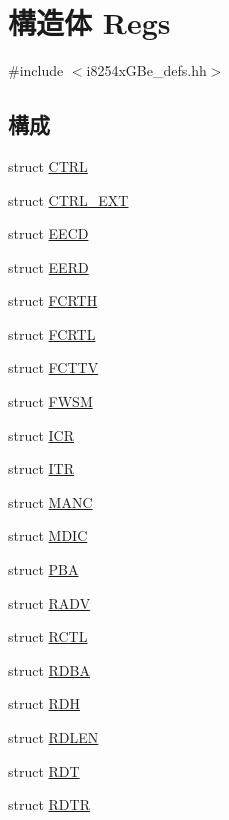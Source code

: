 \hypertarget{structiGbReg_1_1Regs}{
\section{構造体 Regs}
\label{structiGbReg_1_1Regs}
}


{\ttfamily \#include $<$i8254xGBe\_\-defs.hh$>$}\subsection*{構成}
\begin{DoxyCompactItemize}
\item 
struct \hyperlink{structiGbReg_1_1Regs_1_1CTRL}{CTRL}
\item 
struct \hyperlink{structiGbReg_1_1Regs_1_1CTRL__EXT}{CTRL\_\-EXT}
\item 
struct \hyperlink{structiGbReg_1_1Regs_1_1EECD}{EECD}
\item 
struct \hyperlink{structiGbReg_1_1Regs_1_1EERD}{EERD}
\item 
struct \hyperlink{structiGbReg_1_1Regs_1_1FCRTH}{FCRTH}
\item 
struct \hyperlink{structiGbReg_1_1Regs_1_1FCRTL}{FCRTL}
\item 
struct \hyperlink{structiGbReg_1_1Regs_1_1FCTTV}{FCTTV}
\item 
struct \hyperlink{structiGbReg_1_1Regs_1_1FWSM}{FWSM}
\item 
struct \hyperlink{structiGbReg_1_1Regs_1_1ICR}{ICR}
\item 
struct \hyperlink{structiGbReg_1_1Regs_1_1ITR}{ITR}
\item 
struct \hyperlink{structiGbReg_1_1Regs_1_1MANC}{MANC}
\item 
struct \hyperlink{structiGbReg_1_1Regs_1_1MDIC}{MDIC}
\item 
struct \hyperlink{structiGbReg_1_1Regs_1_1PBA}{PBA}
\item 
struct \hyperlink{structiGbReg_1_1Regs_1_1RADV}{RADV}
\item 
struct \hyperlink{structiGbReg_1_1Regs_1_1RCTL}{RCTL}
\item 
struct \hyperlink{structiGbReg_1_1Regs_1_1RDBA}{RDBA}
\item 
struct \hyperlink{structiGbReg_1_1Regs_1_1RDH}{RDH}
\item 
struct \hyperlink{structiGbReg_1_1Regs_1_1RDLEN}{RDLEN}
\item 
struct \hyperlink{structiGbReg_1_1Regs_1_1RDT}{RDT}
\item 
struct \hyperlink{structiGbReg_1_1Regs_1_1RDTR}{RDTR}

\end{DoxyCompactItemize}
